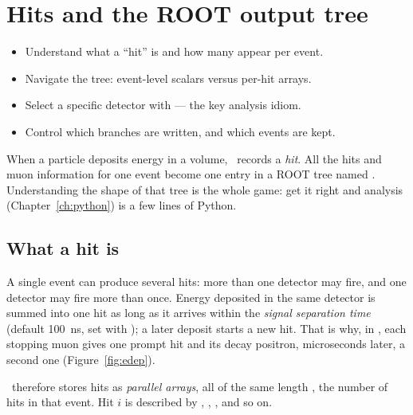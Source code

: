 \chapter{Hits and the ROOT output tree}
\label{ch:output}

\begin{willdo}
\begin{itemize}
  \item Understand what a ``hit'' is and how many appear per event.
  \item Navigate the  tree: event-level scalars versus per-hit arrays.
  \item Select a specific detector with  --- the key analysis idiom.
  \item Control which branches are written, and which events are kept.
\end{itemize}
\end{willdo}

When a particle deposits energy in a  volume, \musrSim\ records a \emph{hit}. All the hits and muon information for one event become one entry in a ROOT tree named . Understanding the shape of that tree is the whole game: get it right and analysis (Chapter~\ref{ch:python}) is a few lines of Python.

\section{What a hit is}
A single event can produce several hits: more than one detector may fire, and one detector may fire more than once. Energy deposited in the same detector is summed into one hit as long as it arrives within the \emph{signal separation time} (default \SI{100}{ns}, set with ); a later deposit starts a new hit. That is why, in , each stopping muon gives one prompt hit and its decay positron, microseconds later, a second one (Figure~\ref{fig:edep}).

\musrSim\ therefore stores hits as \emph{parallel arrays}, all of the same length , the number of hits in that event. Hit \(i\) is described by , , , and so on.

\begin{center}
\end{center}

